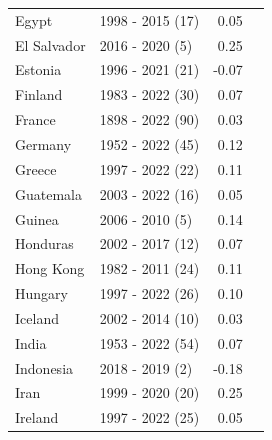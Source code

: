 \begin{table}[H]
{{\begin{tabular}{llrr}
Egypt & 1998 - 2015 (17) & 0.05\\
\addlinespace
El Salvador & 2016 - 2020 (5) & 0.25\\
Estonia & 1996 - 2021 (21) & -0.07\\
Finland & 1983 - 2022 (30) & 0.07\\
France & 1898 - 2022 (90) & 0.03\\
Germany & 1952 - 2022 (45) & 0.12\\
\addlinespace
Greece & 1997 - 2022 (22) & 0.11\\
Guatemala & 2003 - 2022 (16) & 0.05\\
Guinea & 2006 - 2010 (5) & 0.14\\
Honduras & 2002 - 2017 (12) & 0.07\\
Hong Kong & 1982 - 2011 (24) & 0.11\\
\addlinespace
Hungary & 1997 - 2022 (26) & 0.10\\
Iceland & 2002 - 2014 (10) & 0.03\\
India & 1953 - 2022 (54) & 0.07\\
Indonesia & 2018 - 2019 (2) & -0.18\\
Iran & 1999 - 2020 (20) & 0.25\\
\addlinespace
Ireland & 1997 - 2022 (25) & 0.05\\
\end{tabular}
}

}
\end{table}
